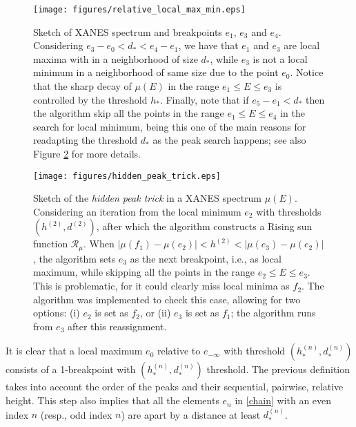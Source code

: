 \documentclass[%
 reprint,
 amsmath,amssymb,
 aps,
]{revtex4-1}
\begin{document}
\begin{figure}[htb]
 \texttt{[image: figures/relative\_local\_max\_min.eps]}
 \caption{Sketch of XANES spectrum and breakpoints $e_1$, $e_3$ and $e_4$. Considering $e_3 - e_0 <d_* <e_4-e_1$, we have that $e_1$ and $e_3$  are local maxima with in a neighborhood of size $d_*$, while $e_3$  is not a local minimum in a neighborhood of same size due to the point $e_0$. Notice that the sharp decay of $\mu(E)$ in the range $e_1\leq E\leq e_3$ is controlled by the threshold $h_*$. Finally, note that if $e_5-e_1<d_*$ then the algorithm skip all the points in the range $e_1\leq E \leq e_4$ in the search for local minimum, being this one of the main reasons for readapting the threshold $d_*$ as the peak search happens; see also Figure \ref{fig:hidden_peak_trick} for more details. \label{fig:relative_local_max_min}}
\end{figure}
\begin{figure}[htb]
 \texttt{[image: figures/hidden\_peak\_trick.eps]}
 \caption{Sketch of the \textit{hidden peak trick} in a XANES spectrum $\mu(E)$. Considering an iteration from the local minimum $e_2$ with thresholds $(h^{(2)},d^{(2)})$, after which the algorithm constructs a Rising sun function $\mathcal{R}_{\mu}$. When $\vert\mu(f_1) - \mu(e_2)\vert<h^{(2)}<\vert\mu(e_3) - \mu(e_2)\vert$,  the algorithm sets $e_3$ as the next breakpoint, i.e., as local maximum, while skipping all the points in the range $e_2\leq E\leq e_3$. This is problematic, for it could clearly miss local minima as  $f_2$. The algorithm was implemented to check this case, allowing for two options: (i) $e_2$ is set as $f_2$, or (ii) $e_3$ is set as $f_1$; the algorithm runs from $e_3$ after this reassignment.  \label{fig:hidden_peak_trick}}
\end{figure}
\noindent
It is clear that a local maximum $e_0$ relative to $e_{-\infty}$ with threshold $(h_*^{(n)},d_*^{(n)})$ consists of a 1-breakpoint with $(h_*^{(n)},d_*^{(n)})$ threshold. The previous definition %
takes into account the order of the peaks and their sequential, pairwise, relative height. This step also implies that all the elements $e_n$ in \eqref{chain} with an  even index $n$ (resp., odd index $n$) are apart by a distance at least $d_*^{(n)}$. 
\end{document}

